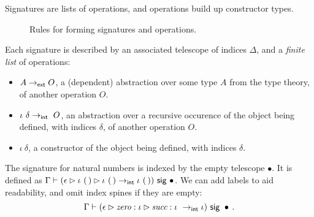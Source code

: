 Signatures are lists of operations, and operations build up constructor types.

\begin{figure}[H]
  \caption{Rules for forming signatures and operations.}
\end{figure}

Each signature is described by an associated telescope of indices $\Delta$, and a
\emph{finite list} of operations:
\begin{itemize}
    \item $A \to_{\textsf{ext}} O$, a (dependent) abstraction over some type $A$ from the
      type theory, of another operation $O$.
    \item $\iota\ \delta \to\internal \ O$, an
      abstraction over a recursive occurence of
      the object being defined, with indices $\delta$, of another operation
      $O$.
    \item $\iota\ \delta$, a constructor of the object being defined, with indices $\delta$.
\end{itemize}

\begin{example}\label{ex:nat-sig}
The signature for natural numbers is indexed by the empty telescope $\bullet$. It is defined as
$\Gamma \vdash (\epsilon \rhd \iota\ (\,) \rhd \iota\ (\,) \to_{\textsf{int}} \iota\ (\,)) \ \textsf{sig}\  \bullet$.
We can add labels to aid readability, and omit index spines if they are empty:
\[
\Gamma \vdash (\epsilon \rhd \textit{zero} : \iota \rhd \textit{succ} : \iota\ \to\internal \iota) \sig \bullet \,.
\]
\end{example}

